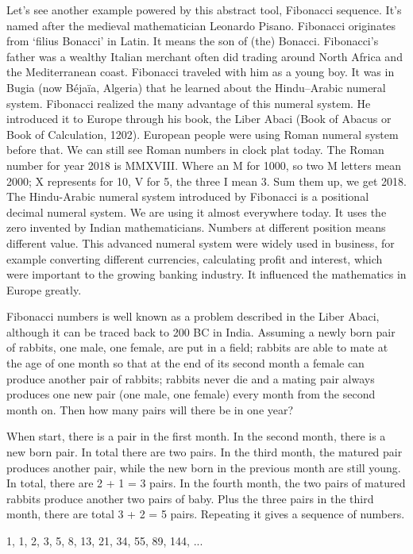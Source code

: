\documentclass[UTF8]{article}
\begin{document}
Let's see another example powered by this abstract tool, Fibonacci sequence. It's named after the medieval mathematician Leonardo Pisano. Fibonacci originates from `filius Bonacci' in Latin. It means the son of (the) Bonacci. Fibonacci's father was a wealthy Italian merchant
 often did trading around North Africa and the Mediterranean coast. Fibonacci traveled with him as a young boy. It was in Bugia (now Béjaïa, Algeria) that he learned about the Hindu–Arabic numeral system. Fibonacci realized the many advantage of this numeral system. He introduced it to Europe through his book, the Liber Abaci (Book of Abacus or Book of Calculation, 1202). European people were using Roman numeral system before that. We can still see Roman numbers in clock plat today. The Roman number for year 2018 is MMXVIII. Where an M for 1000, so two M letters mean 2000; X represents for 10, V for 5, the three I mean 3. Sum them up, we get 2018. The Hindu-Arabic numeral system introduced by Fibonacci is a positional decimal numeral system. We are using it almost everywhere today. It uses the zero invented by Indian mathematicians. Numbers at different position means different value. This advanced numeral system were widely used in business, for example converting different currencies, calculating profit and interest, which were important to the growing banking industry. It influenced the mathematics in Europe greatly.

Fibonacci numbers is well known as a problem described in the Liber Abaci, although it can be traced back to 200 BC in India. Assuming a newly born pair of rabbits, one male, one female, are put in a field; rabbits are able to mate at the age of one month so that at the end of its second month a female can produce another pair of rabbits; rabbits never die and a mating pair always produces one new pair (one male, one female) every month from the second month on. Then how many pairs will there be in one year?

When start, there is a pair in the first month. In the second month, there is a new born pair. In total there are two pairs. In the third month, the matured pair produces another pair, while the new born in the previous month are still young. In total, there are 2 + 1 = 3 pairs. In the fourth month, the two pairs of matured rabbits produce another two pairs of baby. Plus the three pairs in the third month, there are total 3 + 2 = 5 pairs. Repeating it gives a sequence of numbers.

1, 1, 2, 3, 5, 8, 13, 21, 34, 55, 89, 144, ...
\end{document}
